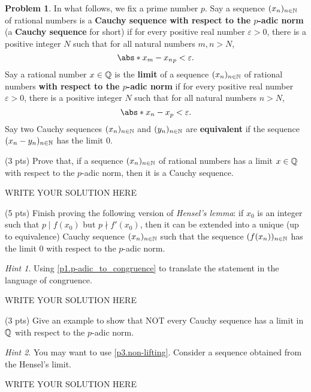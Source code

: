 \documentclass[11pt]{article}
\theoremstyle{plain}
\theoremstyle{definition}
\newtheorem{problem}{Problem}
\theoremstyle{remark}
\newtheorem*{hint}{Hint}
\numberwithin{equation}{problem}
\begin{document}
\begin{problem}
	In what follows, we fix a prime number $p$. 
	Say a sequence $(x_n)_{n\in\mathbb{N}}$ of rational numbers is a \textbf{Cauchy sequence with respect to the $p$-adic norm} (a \textbf{Cauchy sequence} for short) if for every positive real number $\varepsilon>0$, there is a positive integer $N$ such that for all natural numbers $m,n>N$,  
	\[
		\abs*{x_m-x_n}_p<\varepsilon.
	\]
	Say a rational number $x\in\mathbb{Q}$ is the \textbf{limit} of a sequence $(x_n)_{n\in\mathbb{N}}$ of rational numbers \textbf{with respect to the $p$-adic norm} if for every positive real number $\varepsilon>0$, there is a positive integer $N$ such that for all natural numbers $n>N$,  
	\[
		\abs*{x_n-x}_p<\varepsilon.
	\]
	Say two Cauchy sequences $(x_n)_{n\in\mathbb{N}}$ and $(y_n)_{n\in\mathbb{N}}$ are \textbf{equivalent} if the sequence $(x_n-y_n)_{n\in\mathbb{N}}$ has the limit $0$.
	\begin{listinprob}[resume]
		\item (3 pts) Prove that, if a sequence $(x_n)_{n\in\mathbb{N}}$ of rational numbers has a limit $x\in\mathbb{Q}$ with respect to the $p$-adic norm, then it is a Cauchy sequence.
\begin{solution} %
WRITE YOUR SOLUTION HERE
\end{solution}\clearpage %

		\item (5 pts) Finish proving the following version of \emph{Hensel's lemma}: if $x_0$ is an integer such that $p\mid f(x_0)$ but $p\nmid f'(x_0)$, then it can be extended into a unique (up to equivalence) Cauchy sequence $(x_n)_{n\in\mathbb{N}}$ such that the sequence $(f(x_n))_{n\in\mathbb{N}}$ has the limit $0$ with respect to the $p$-adic norm. 
		\begin{hint}
			Using \cref{p1.p-adic_to_congruence} to translate the statement in the language of congruence.
		\end{hint}
\begin{solution} %
WRITE YOUR SOLUTION HERE
\end{solution}\clearpage %

		\item (3 pts) Give an example to show that NOT every Cauchy sequence has a limit in $\mathbb{Q}$ with respect to the $p$-adic norm.
		\begin{hint}
			You may want to use \cref{p3.non-lifting}. Consider a sequence obtained from the Hensel's limit. 
		\end{hint}
	\end{listinprob}
\end{problem}
\begin{solution} %
WRITE YOUR SOLUTION HERE
\end{solution}\clearpage %
\end{document}
